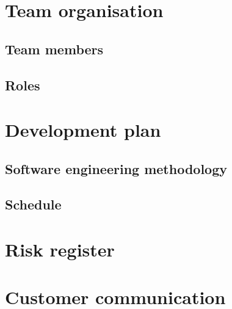 \documentclass[10pt,a4paper]{article}
\begin{document}
\section{Team organisation}

\subsection{Team members}

\subsection{Roles}


\section{Development plan}

\subsection{Software engineering methodology}

\subsection{Schedule}


\section{Risk register}


\section{Customer communication}
\end{document}
